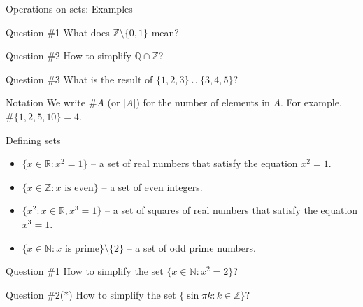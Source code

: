 \documentclass{zkdl-presentation-template}
\begin{document}
    \begin{frame}{Operations on sets: Examples}
      \begin{questionblock}{Question \#1}
        What does $\mathbb{Z} \setminus \{0,1\}$ mean?\pause
      \end{questionblock}

      \begin{questionblock}{Question \#2}
        How to simplify $\mathbb{Q} \cap \mathbb{Z}$?\pause
      \end{questionblock}

      \begin{questionblock}{Question \#3}
        What is the result of $\{1,2,3\} \cup \{3,4,5\}$?
      \end{questionblock}
      \pause

      \begin{remarkblock}{Notation}
        We write $\#A$ (or $|A|$) for the number of elements in $A$. For example, $\#\{1,2,5,10\} = 4$.
      \end{remarkblock}
    \end{frame}

    \begin{frame}{Defining sets}
      \begin{example}
        \begin{itemize}
          \item $\{x \in \mathbb{R}: x^2 = 1\}$ -- a set of real numbers that satisfy the equation $x^2 = 1$.\pause
          \item $\{x \in \mathbb{Z}: x \text{ is even}\}$ -- a set of even integers.\pause
          \item $\{x^2: x \in \mathbb{R}, x^3 = 1\}$ -- a set of squares of real numbers that satisfy the equation $x^3 = 1$.\pause
          \item $\{x \in \mathbb{N}: x \text{ is prime}\} \setminus \{2\}$ -- a set of odd prime numbers.\pause
        \end{itemize}
      \end{example}

      \begin{questionblock}{Question \#1}
        How to simplify the set $\{x \in \mathbb{N}: x^2 = 2\}$?\pause
      \end{questionblock}
  
      \begin{questionblock}{Question \#2(*)}
        How to simplify the set $\{\sin \pi k: k \in \mathbb{Z}\}$?
      \end{questionblock}
    \end{frame}
\end{document}
